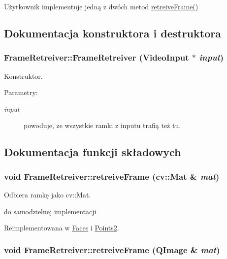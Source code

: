 Użytkownik implementuje jedną z dwóch metod \hyperlink{class_frame_retreiver_061c97e43f3b73705903e49afad3e5bf}{retreiveFrame()} 

\subsection{Dokumentacja konstruktora i destruktora}
\hypertarget{class_frame_retreiver_ec5e4a7cd0af2badc9b47fd3c936ac60}{
\subsubsection[{FrameRetreiver}]{\setlength{\rightskip}{0pt plus 5cm}FrameRetreiver::FrameRetreiver ({\bf VideoInput} $\ast$ {\em input})}}
\label{class_frame_retreiver_ec5e4a7cd0af2badc9b47fd3c936ac60}


Konstruktor. 

\begin{Desc}
\item[Parametry:]
\begin{description}
\item[{\em input}]powoduje, ze wszystkie ramki z inputu trafią też tu. \end{description}
\end{Desc}


\subsection{Dokumentacja funkcji składowych}
\hypertarget{class_frame_retreiver_72912583af45c00d267f215a0d0b9bb1}{
\subsubsection[{retreiveFrame}]{\setlength{\rightskip}{0pt plus 5cm}void FrameRetreiver::retreiveFrame (cv::Mat \& {\em mat})}}
\label{class_frame_retreiver_72912583af45c00d267f215a0d0b9bb1}


Odbiera ramkę jako cv::Mat. 

do samodzielnej implementacji 

Reimplementowana w \hyperlink{class_faces_7fd92e73e117b72898097551b964fd96}{Faces} i \hyperlink{class_points2_f46dd0cd21f73b3214d5f766349b8450}{Points2}.\hypertarget{class_frame_retreiver_061c97e43f3b73705903e49afad3e5bf}{
\subsubsection[{retreiveFrame}]{\setlength{\rightskip}{0pt plus 5cm}void FrameRetreiver::retreiveFrame (QImage \& {\em mat})}}
\label{class_frame_retreiver_061c97e43f3b73705903e49afad3e5bf}


